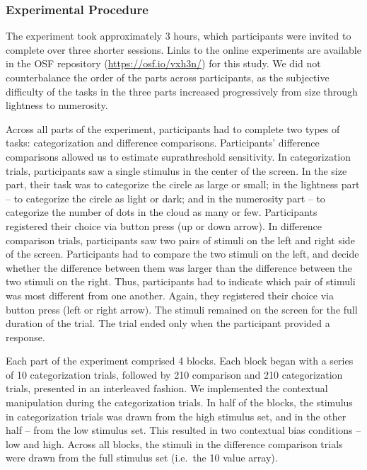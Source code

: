 \documentclass[a4paper, nobind]{templates/ociamthesis}
\begin{document}
\hypertarget{experimental-procedure-4}{%
\subsubsection{Experimental Procedure}\label{experimental-procedure-4}}

The experiment took approximately 3 hours, which participants were invited to complete over three shorter sessions. Links to the online experiments are available in the OSF repository (\url{https://osf.io/vxh3n/}) for this study. We did not counterbalance the order of the parts across participants, as the subjective difficulty of the tasks in the three parts increased progressively from size through lightness to numerosity.

Across all parts of the experiment, participants had to complete two types of tasks: categorization and difference comparisons. Participants' difference comparisons allowed us to estimate suprathreshold sensitivity. In categorization trials, participants saw a single stimulus in the center of the screen. In the size part, their task was to categorize the circle as large or small; in the lightness part -- to categorize the circle as light or dark; and in the numerosity part -- to categorize the number of dots in the cloud as many or few. Participants registered their choice via button press (up or down arrow). In difference comparison trials, participants saw two pairs of stimuli on the left and right side of the screen. Participants had to compare the two stimuli on the left, and decide whether the difference between them was larger than the difference between the two stimuli on the right. Thus, participants had to indicate which pair of stimuli was most different from one another. Again, they registered their choice via button press (left or right arrow). The stimuli remained on the screen for the full duration of the trial. The trial ended only when the participant provided a response.

Each part of the experiment comprised 4 blocks. Each block began with a series of 10 categorization trials, followed by 210 comparison and 210 categorization trials, presented in an interleaved fashion. We implemented the contextual manipulation during the categorization trials. In half of the blocks, the stimulus in categorization trials was drawn from the high stimulus set, and in the other half -- from the low stimulus set. This resulted in two contextual bias conditions -- low and high. Across all blocks, the stimuli in the difference comparison trials were drawn from the full stimulus set (i.e.~the 10 value array).
\end{document}
